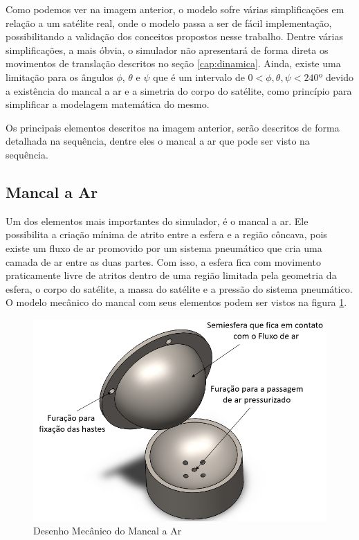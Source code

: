  Como podemos ver na imagem anterior, o modelo sofre várias simplificações em relação a um satélite real, onde o modelo passa a ser de fácil implementação, possibilitando a validação dos conceitos propostos nesse trabalho. Dentre várias simplificações, a mais óbvia, o simulador não apresentará de forma direta os movimentos de translação descritos no seção \ref{cap:dinamica}. Ainda, existe uma limitação para os ângulos $\phi$, $\theta$ e $\psi$ que é um intervalo de $0<\phi, \theta, \psi<240º$ devido a existência do mancal a ar e a simetria do corpo do satélite, como princípio para simplificar a modelagem matemática do mesmo.

Os principais elementos descritos na imagem anterior, serão descritos de forma detalhada na sequência, dentre eles o mancal a ar que pode ser visto na sequência.



\subsection{Mancal a Ar}

Um dos elementos mais importantes do simulador, é o mancal a ar. Ele possibilita a criação mínima de atrito entre a esfera e a região côncava, pois existe um fluxo de ar promovido por um sistema pneumático que cria uma camada de ar entre as duas partes. Com isso, a esfera fica com movimento praticamente livre de atritos dentro de uma região limitada pela geometria da esfera, o corpo do satélite, a massa do satélite e a pressão do sistema pneumático. O modelo mecânico do mancal com seus elementos podem ser vistos na figura \ref{fig:base_desenho}.

\begin{figure}[H]
  \caption{Desenho Mecânico do Mancal a Ar}
  \begin{center}
      \includegraphics[scale=.45]{metodologia/img/base_desenho}
  \end{center}
  \label{fig:base_desenho}
\end{figure}

